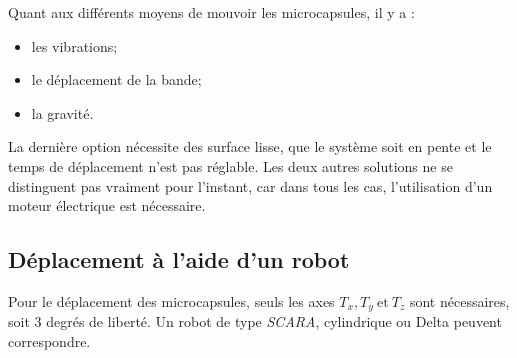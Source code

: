 Quant aux différents moyens de mouvoir les microcapsules, il y a : 
\begin{itemize}
    \item les vibrations;
    \item le déplacement de la bande;
    \item la gravité.
\end{itemize}

La dernière option nécessite des surface lisse, que le système soit en pente et le temps de déplacement n'est pas réglable. Les deux autres solutions ne se distinguent pas vraiment pour l'instant, car dans tous les cas, l'utilisation d'un moteur électrique est nécessaire.

\subsection*{Déplacement à l'aide d'un robot}
Pour le déplacement des microcapsules, seuls les axes $T_x, T_y~\text{et}~T_z$ sont nécessaires, soit $3$ degrés de liberté. Un robot de type \textit{SCARA}, cylindrique ou Delta peuvent correspondre.

